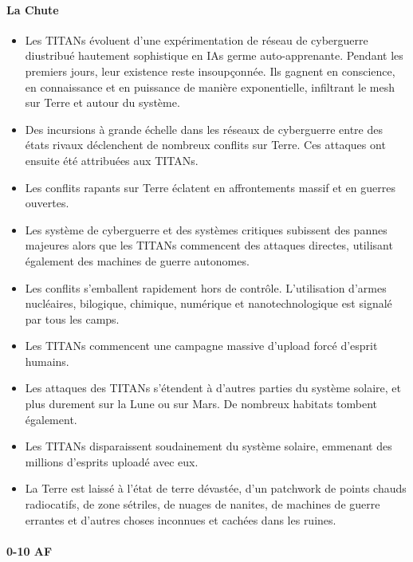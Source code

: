 \paragraph{La Chute} 

\begin{itemize} \item Les TITANs évoluent d'une expérimentation de réseau de cyberguerre diustribué hautement sophistique en IAs germe auto-apprenante. Pendant les premiers jours, leur existence reste insoupçonnée. Ils gagnent en conscience, en connaissance et en puissance de manière exponentielle, infiltrant le  mesh sur Terre et autour du système. \item Des incursions à grande échelle dans les réseaux de cyberguerre entre des états rivaux déclenchent de nombreux conflits sur Terre. Ces attaques ont ensuite été attribuées aux TITANs. \item Les conflits rapants sur Terre éclatent en affrontements massif et en guerres ouvertes. \item Les système de cyberguerre et des systèmes critiques subissent des pannes majeures alors que les TITANs commencent des attaques directes, utilisant également des machines de guerre autonomes. \item Les conflits s'emballent rapidement hors de contrôle. L'utilisation d'armes nucléaires, bilogique, chimique, numérique et nanotechnologique est signalé par tous les camps. \item Les TITANs commencent une campagne massive d'upload forcé d'esprit humains. \item Les attaques des TITANs s'étendent à d'autres parties du système solaire, et plus durement sur la Lune ou sur Mars. De nombreux habitats tombent également. \item Les TITANs disparaissent soudainement du système solaire, emmenant des millions d'esprits uploadé avec eux. \item La Terre est laissé à l'état de terre dévastée, d'un patchwork de points chauds radiocatifs, de zone sétriles, de nuages de nanites, de machines de guerre errantes et d'autres choses inconnues et cachées dans les ruines. \end{itemize} 

\paragraph{0-10 AF} 

